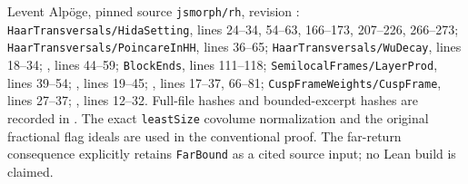 Levent Alp\"oge, pinned source \texttt{jsmorph/rh}, revision
:
\texttt{HaarTransversals/HidaSetting}, lines 24--34, 54--63,
166--173, 207--226, 266--273;
\texttt{HaarTransversals/PoincareInHH}, lines 36--65;
\texttt{HaarTransversals/WuDecay}, lines 18--34;
,
lines 44--59; \texttt{BlockEnds}, lines 111--118;
\texttt{SemilocalFrames/LayerProd}, lines 39--54;
, lines 19--45;
,
lines 17--37, 66--81;
\texttt{CuspFrameWeights/CuspFrame}, lines 27--37;
,
lines 12--32.  Full-file hashes and bounded-excerpt hashes are
recorded in .
The exact \texttt{leastSize} covolume normalization and the original
fractional flag ideals are used in the conventional proof.
The far-return consequence explicitly retains \texttt{FarBound}
as a cited source input; no Lean build is claimed.
